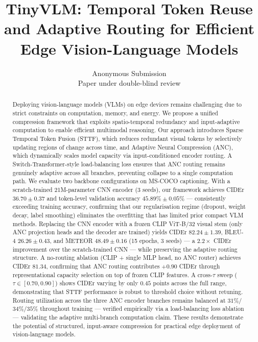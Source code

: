 \documentclass{article}
\title{TinyVLM: Temporal Token Reuse and Adaptive Routing for Efficient Edge Vision-Language Models}
\author{%
  Anonymous Submission \\
  Paper under double-blind review \\
}
\begin{document}
\maketitle


\begin{abstract}
Deploying vision-language models (VLMs) on edge devices remains challenging due to strict constraints on computation, memory, and energy. We propose a unified compression framework that exploits spatio-temporal redundancy and input-adaptive computation to enable efficient multimodal reasoning. Our approach introduces Sparse Temporal Token Fusion (STTF), which reduces redundant visual tokens by selectively updating regions of change across time, and Adaptive Neural Compression (ANC), which dynamically scales model capacity via input-conditioned encoder routing. A Switch-Transformer-style load-balancing loss ensures that ANC routing remains genuinely adaptive across all branches, preventing collapse to a single computation path. We evaluate two backbone configurations on MS-COCO captioning. With a scratch-trained 21M-parameter CNN encoder (3 seeds), our framework achieves CIDEr $36.70 \pm 0.37$ and token-level validation accuracy $45.89\% \pm 0.05\%$ --- consistently exceeding training accuracy, confirming that our regularisation regime (dropout, weight decay, label smoothing) eliminates the overfitting that has limited prior compact VLM methods. Replacing the CNN encoder with a frozen CLIP ViT-B/32 visual stem (only ANC projection heads and the decoder are trained) yields CIDEr $82.24 \pm 1.39$, BLEU-4 $26.26 \pm 0.43$, and METEOR $48.49 \pm 0.16$ (15 epochs, 3 seeds) --- a $2.2\times$ CIDEr improvement over the scratch-trained CNN --- while preserving the adaptive routing structure. A no-routing ablation (CLIP + single MLP head, no ANC router) achieves CIDEr $81.34$, confirming that ANC routing contributes $+0.90$ CIDEr through representational capacity selection on top of frozen CLIP features. A cross-$\tau$ sweep ($\tau \in [0.70, 0.90]$) shows CIDEr varying by only $0.45$ points across the full range, demonstrating that STTF performance is robust to threshold choice without retuning. Routing utilization across the three ANC encoder branches remains balanced at $31\%$/$34\%$/$35\%$ throughout training --- verified empirically via a load-balancing loss ablation --- validating the adaptive multi-branch computation claim. These results demonstrate the potential of structured, input-aware compression for practical edge deployment of vision-language models.
\end{abstract}
\end{document}
